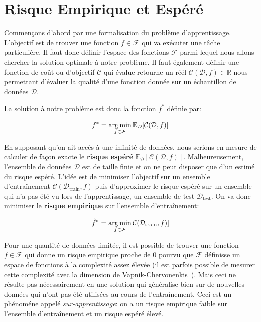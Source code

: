 \section{Risque Empirique et Espéré}

Commençons d'abord par une formalisation du problème d'apprentissage.
L'objectif est de trouver une fonction $f\in\mathcal{F}$ qui va exécuter une
tâche particulière. Il faut donc définir l'espace des fonctions $\mathcal{F}$
parmi lequel nous allons chercher la solution optimale à notre problème.  Il
faut également définir une fonction de coût ou d'objectif $\mathcal{C}$ qui
évalue retourne un réél $\mathcal{C}(\mathcal{D},f)\in\mathbb{R}$ nous
permettant d'évaluer la qualité d'une fonction donnée sur un échantillon de
données $\mathcal{D}$.

La solution à notre problème est donc la fonction $f^*$ définie par:

\begin{equation}
\label{eq:graal}
f^* = \operatorname*{arg\,min}_{f \in \mathcal{F}} {\mathbb E}_\mathcal{D}[\mathcal{C}(\mathcal{D},f)]
\end{equation}


En supposant qu'on ait accès à une infinité de données, nous serions en mesure
de calculer de façon exacte le {\bf risque espéré} ${\mathbb
E}_\mathcal{D}[\mathcal{C}(\mathcal{D},f)]$. Malheureusement, l'ensemble de
données $\mathcal{D}$ est de taille finie et on ne peut disposer que d'un estimé
du risque espéré. L'idée est de minimiser l'objectif sur un ensemble d'entraînement
$\mathcal{C}(\mathcal{D}_\textrm{train},f)$ puis d'approximer le risque espéré sur un ensemble
qui n'a pas été vu lors de l'apprentissage, un ensemble de test
$\mathcal{D}_\textrm{test}$. On va donc minimiser le {\bf risque empirique} sur
l'ensemble d'entraînement:

\begin{equation}
\label{eq:graal}
\hat{f}^* = \operatorname*{arg\,min}_{f \in \mathcal{F}} \mathcal{C}(\mathcal{D}_\textrm{train},f)]
\end{equation}

Pour une quantité de données limitée, il est possible de trouver une fonction
$f\in\mathcal{F}$ qui donne un risque empirique proche de $0$ pourvu que
$\mathcal{F}$ définisse un espace de fonctions à la complexité assez élevée (il
est parfois possible de mesurer cette complexité avec la dimension de
Vapnik-Chervonenkis~\citep{Vapnik71}). Mais ceci ne résulte pas nécessairement en une solution
qui généralise bien sur de nouvelles données qui n'ont pas été utilisées au
cours de l'entraînement. Ceci est un phénoméne appelé \emph{sur-apprentissage}:
on a un risque empirique faible sur l'ensemble d'entraînement et un risque
espéré élevé. 

